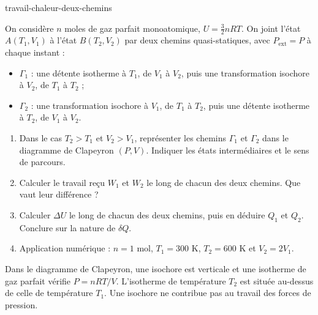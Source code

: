 \begin{exo}{travail-chaleur-deux-chemins}

On considère $n$ moles de gaz parfait monoatomique,
$U=\frac{3}{2}nRT$. On joint l'état $A(T_1,V_1)$ à l'état $B(T_2,V_2)$
par deux chemins quasi-statiques, avec $P_{\mathrm{ext}}=P$ à chaque instant :
\begin{itemize}
\item $\Gamma_1$ : une détente isotherme à $T_1$, de $V_1$ à $V_2$,
puis une transformation isochore à $V_2$, de $T_1$ à $T_2$ ;
\item $\Gamma_2$ : une transformation isochore à $V_1$, de $T_1$ à $T_2$,
puis une détente isotherme à $T_2$, de $V_1$ à $V_2$.
\end{itemize}

\begin{enumerate}
\item Dans le cas $T_2>T_1$ et $V_2>V_1$, représenter les chemins
$\Gamma_1$ et $\Gamma_2$ dans le diagramme de Clapeyron $(P,V)$. Indiquer
les états intermédiaires et le sens de parcours.
\item Calculer le travail reçu $W_1$ et $W_2$ le long de chacun des deux
chemins. Que vaut leur différence ?
\item Calculer $\Delta U$ le long de chacun des deux chemins, puis en déduire
$Q_1$ et $Q_2$. Conclure sur la nature de $\delta Q$.
\item Application numérique : $n=1$ mol, $T_1=300$ K, $T_2=600$ K et
$V_2=2V_1$.
\end{enumerate}

\begin{indication}
Dans le diagramme de Clapeyron, une isochore est verticale et une isotherme
de gaz parfait vérifie $P=nRT/V$. L'isotherme de température $T_2$ est située
au-dessus de celle de température $T_1$. Une isochore ne contribue pas au
travail des forces de pression.
\end{indication}


\end{exo}
